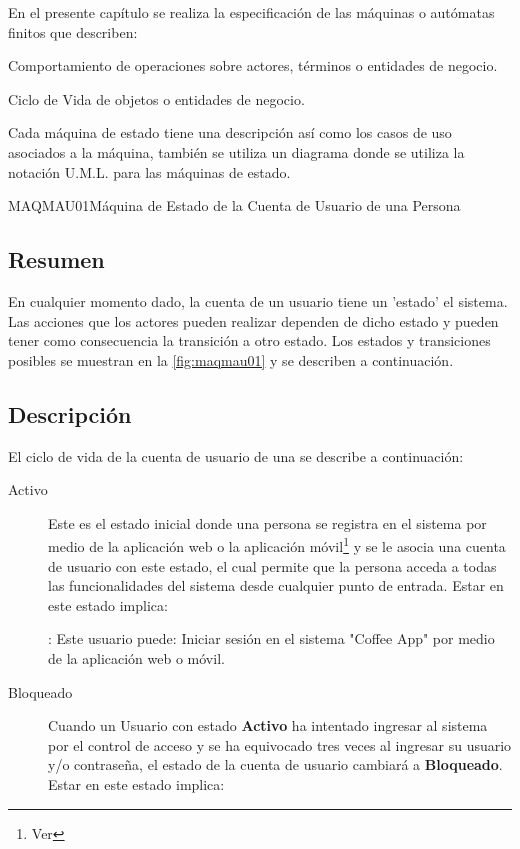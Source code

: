 En el presente capítulo se realiza la especificación de las máquinas o autómatas finitos que describen:
	\begin{Citemize}
		\item Comportamiento de operaciones sobre actores, términos o entidades de negocio.
		\item Ciclo de Vida de objetos o entidades de negocio.
	\end{Citemize}

Cada máquina de estado tiene una descripción así como los casos de uso asociados a la máquina, también se utiliza un diagrama donde se utiliza la notación U.M.L. para las máquinas de estado.

\begin{Maquina}{MAQMAU01}{Máquina de Estado de la Cuenta de Usuario de una Persona}

\subsection{Resumen}

En cualquier momento dado, la cuenta de un usuario tiene un ’estado’ el  sistema. Las acciones que los actores pueden realizar dependen de dicho estado y pueden tener como consecuencia la transición a otro estado. Los estados y transiciones posibles se muestran en la 	\ref{fig:maqmau01} y se describen a continuación.
	\subsection{Descripción}
	El ciclo de vida de la cuenta de usuario de una   se describe a continuación:
		\begin{description}
			\item[Activo] Este es el estado inicial donde  una persona se registra en el sistema por medio de la aplicación web o la aplicación móvil\footnote{Ver } y se le asocia una cuenta de usuario con este estado, el cual permite que la persona acceda a todas las funcionalidades del sistema desde cualquier punto de entrada. Estar en este estado implica:
			
			\begin{Titemize}
			\Titem {}: 	Este usuario puede: Iniciar sesión en el sistema "Coffee App" por medio de la aplicación web o móvil.
			\end{Titemize}
			
			\item[Bloqueado] Cuando un Usuario con estado \textbf{Activo} ha intentado ingresar al sistema por el control de acceso y se ha equivocado tres veces al ingresar su usuario y/o contraseña, el estado de la cuenta de usuario cambiará a \textbf{Bloqueado}. Estar en este estado implica:
			

\end{description}
\end{Maquina}
